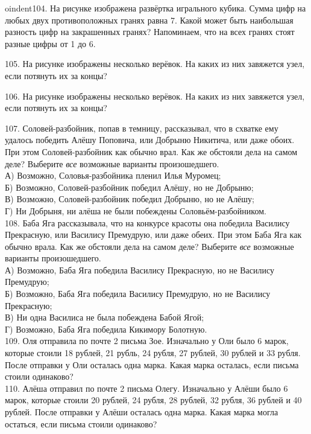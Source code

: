 oindent104. На рисунке изображена развёртка игрального кубика. Сумма цифр на любых двух противоположных гранях равна 7. Какой может быть наибольшая разность цифр на закрашенных гранях? Напоминаем, что на всех гранях стоят разные цифры от 1 до 6.
\begin{center}
\begin{figure}[ht!]
\end{figure}
\end{center}
105. На рисунке изображены несколько верёвок. На каких из них завяжется узел, если потянуть их за концы?
\begin{center}
\begin{figure}[ht!]
\end{figure}
\end{center}
106. На рисунке изображены несколько верёвок. На каких из них завяжется узел, если потянуть их за концы?
\begin{center}
\begin{figure}[ht!]
\end{figure}
\end{center}
107. Соловей-разбойник, попав в темницу, рассказывал, что в схватке ему удалось победить Алёшу Поповича, или Добрыню Никитича, или даже обоих. При этом Соловей-разбойник как обычно врал. Как же обстояли дела на самом деле? Выберите {\it все} возможные варианты произошедшего.\\
А) Возможно, Соловья-разбойника пленил Илья Муромец;\\
Б) Возможно, Соловей-разбойник победил Алёшу, но не Добрыню;\\
В) Возможно, Соловей-разбойник победил Добрыню, но не Алёшу;\\
Г) Ни Добрыня, ни алёша не были побеждены Соловьём-разбойником.\\
108. Баба Яга рассказывала, что на конкурсе красоты она победила Василису Прекрасную, или Василису Премудрую, или даже обеих. При этом Баба Яга как обычно врала. Как же обстояли дела на самом деле? Выберите {\it все} возможные варианты произошедшего.\\
А) Возможно, Баба Яга победила Василису Прекрасную, но не Василису Премудрую;\\
Б) Возможно, Баба Яга победила Василису Премудрую, но не Василису Прекрасную;\\
В) Ни одна Василиса не была побеждена Бабой Ягой;\\
Г) Возможно, Баба Яга победила Кикимору Болотную.\\
109. Оля отправила по почте 2 письма Зое. Изначально у Оли было 6 марок, которые стоили 18 рублей, 21 рубль, 24 рубля, 27 рублей, 30 рублей и 33 рубля. После отправки у Оли осталась одна марка. Какая марка осталась, если письма стоили одинаково?\\
110. Алёша отправил по почте 2 письма Олегу. Изначально у Алёши было 6 марок, которые стоили 20 рублей, 24 рубля, 28 рублей, 32 рубля, 36 рублей и 40 рублей. После отправки у Алёши осталась одна марка. Какая марка могла остаться, если письма стоили одинаково?

